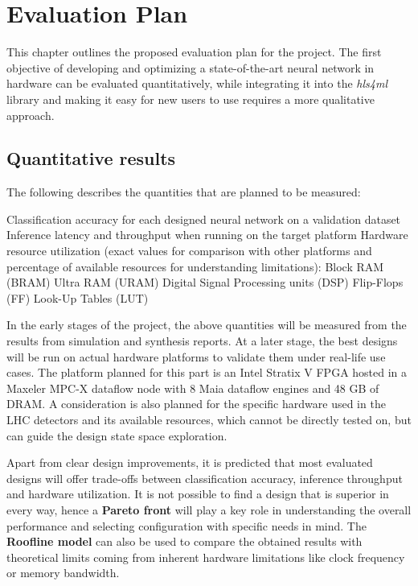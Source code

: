 \chapter{Evaluation Plan}\label{evaluation}
This chapter outlines the proposed evaluation plan for the project. The first objective of developing and optimizing a state-of-the-art neural network in hardware can be evaluated quantitatively, while integrating it into the \textit{hls4ml} library and making it easy for new users to use requires a more qualitative approach.

\section{Quantitative results}
The following describes the quantities that are planned to be measured:

\begin{outline}
  \1 Classification accuracy for each designed neural network on a validation dataset
  \1 Inference latency and throughput when running on the target platform
  \1 Hardware resource utilization (exact values for comparison with other platforms and percentage of available resources for understanding limitations):
    \2 Block RAM (BRAM)
    \2 Ultra RAM (URAM)
    \2 Digital Signal Processing units (DSP)
    \2 Flip-Flops (FF)
    \2 Look-Up Tables (LUT)
\end{outline}

In the early stages of the project, the above quantities will be measured from the results from simulation and synthesis reports. At a later stage, the best designs will be run on actual hardware platforms to validate them under real-life use cases. The platform planned for this part is an Intel Stratix V FPGA hosted in a Maxeler MPC-X dataflow node with 8 Maia dataflow engines and 48 GB of DRAM. A consideration is also planned for the specific hardware used in the LHC detectors and its available resources, which cannot be directly tested on, but can guide the design state space exploration.

Apart from clear design improvements, it is predicted that most evaluated designs will offer trade-offs between classification accuracy, inference throughput and hardware utilization. It is not possible to find a design that is superior in every way, hence a \textbf{Pareto front} will play a key role in understanding the overall performance and selecting configuration with specific needs in mind. The \textbf{Roofline model} can also be used to compare the obtained results with theoretical limits coming from inherent hardware limitations like clock frequency or memory bandwidth.

